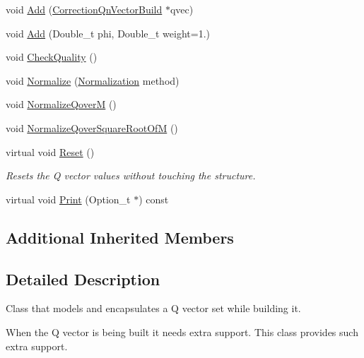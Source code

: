 \begin{DoxyCompactItemize}
\item 
void \mbox{\hyperlink{classQn_1_1CorrectionQnVectorBuild_aa7c654825f87b26452a1baeedcb0ac71}{Add}} (\mbox{\hyperlink{classQn_1_1CorrectionQnVectorBuild}{Correction\+Qn\+Vector\+Build}} $\ast$qvec)
\item 
void \mbox{\hyperlink{classQn_1_1CorrectionQnVectorBuild_abf29822fdbf4c7c05d6bc13961a4e5af}{Add}} (Double\+\_\+t phi, Double\+\_\+t weight=1.)
\item 
void \mbox{\hyperlink{classQn_1_1CorrectionQnVectorBuild_a5f22254d0868abcb2f3a8db6f6e21416}{Check\+Quality}} ()
\item 
void \mbox{\hyperlink{classQn_1_1CorrectionQnVectorBuild_a2a16337a295cdf8674956432ad009d72}{Normalize}} (\mbox{\hyperlink{classQn_1_1CorrectionQnVector_a2998fe4babb716c57848c8c73b24a398}{Normalization}} method)
\item 
void \mbox{\hyperlink{classQn_1_1CorrectionQnVectorBuild_abe5a66d644a51087ddd3946bce0c58f5}{Normalize\+QoverM}} ()
\item 
void \mbox{\hyperlink{classQn_1_1CorrectionQnVectorBuild_a64644f0c2f52f98399db120028574fd3}{Normalize\+Qover\+Square\+Root\+OfM}} ()
\item 
\mbox{\label{classQn_1_1CorrectionQnVectorBuild_a4a969142a64433fe57debb8ec5210329}} 
virtual void \mbox{\hyperlink{classQn_1_1CorrectionQnVectorBuild_a4a969142a64433fe57debb8ec5210329}{Reset}} ()
\begin{DoxyCompactList}\small\item\em Resets the Q vector values without touching the structure. \end{DoxyCompactList}\item 
virtual void \mbox{\hyperlink{classQn_1_1CorrectionQnVectorBuild_a8b767040ac4ae2472e8ce8f091b5ce88}{Print}} (Option\+\_\+t $\ast$) const
\end{DoxyCompactItemize}
\subsection*{Additional Inherited Members}


\subsection{Detailed Description}
Class that models and encapsulates a Q vector set while building it. 

When the Q vector is being built it needs extra support. This class provides such extra support.

